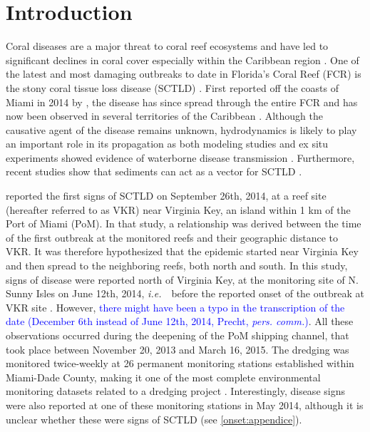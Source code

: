 \documentclass[preprint,12pt,authoryear]{elsarticle}
\newcommand{\ie}{{\it i.e.}\ }
\newcommand{\modif}[1]{\textcolor{blue}{#1}}
\begin{document}
\linenumbers

\section{Introduction}

Coral diseases are a major threat to coral reef ecosystems and have led to significant declines in coral cover especially within the Caribbean region \citep{richardson1998coral, sutherland2004disease, aronson2001white, harvell2007coral, brandt2009dynamics}. One of the latest and most damaging outbreaks to date in Florida's Coral Reef (FCR) is the stony coral tissue loss disease (SCTLD) \citep{noaa2018}. First reported off the coasts of Miami in 2014 by \cite{precht2016unprecedented}, the disease has since spread through the entire FCR \citep{muller2020spatial,dobbelaere2022connecting} and has now been observed in several territories of the Caribbean \citep{kramer2019map, meiling2021variable, estrada2021effects,heres2021ecological}. Although the causative agent of the disease remains unknown, hydrodynamics is likely to play an important role in its propagation as both modeling studies and ex situ experiments showed evidence of waterborne disease transmission \citep{aeby2019pathogenesis,dobbelaere2020coupled,eaton2021measuring, meiling2021variable}. Furthermore, recent studies show that sediments can act as  a vector for SCTLD \citep{rosales2020rhodobacterales, studivan2022reef}.

\cite{precht2016unprecedented} reported the first signs of SCTLD on September 26th, 2014, at a reef site (hereafter referred to as VKR) near Virginia Key, an island within 1 km of the Port of Miami (PoM). In that study, a relationship was derived between the time of the first outbreak at the monitored reefs and their geographic distance to VKR. It was therefore hypothesized that the epidemic started near Virginia Key and then spread to the neighboring reefs, both north and south. In this study, signs of disease were reported north of Virginia Key, at the monitoring site of N. Sunny Isles on June 12th, 2014, \ie~before the reported onset of the outbreak at VKR site \citep{precht2016unprecedented}. However, \modif{there might have been a typo in the transcription of the date (December 6th instead of June 12th, 2014, Precht, \textit{pers. comm.})}. All these observations occurred during the deepening of the PoM shipping channel, that took place between November 20, 2013 and March 16, 2015. The dredging was monitored twice-weekly at 26 permanent monitoring stations established within Miami-Dade County, making it one of the most complete environmental monitoring datasets related to a dredging project \citep{gintert2019regional}. Interestingly, disease signs were also reported at one of these monitoring stations in May 2014, although it is unclear whether these were signs of SCTLD (see \ref{onset:appendice}).
\end{document}
